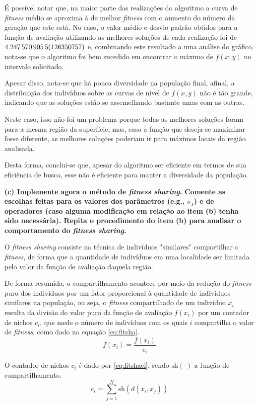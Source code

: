 \documentclass[a4paper, 12pt]{article}
\newcommand{\fitness}{\textit{fitness}\xspace}
\newcommand{\fitsha}{\textit{fitness sharing}\xspace}
\newcommand{\sh}{\text{sh}\xspace}
\begin{document}
É possível notar que, na maior parte das realizações do algoritmo a curva de \fitness médio se aproxima à de melhor \fitness com o aumento do número da geração que este está. No caso, o valor médio e desvio padrão obtidos para a função de avaliação utilizando as melhores soluções de cada realização foi de $\num{4.2475709055\pm 0.0126350757}$ e, combinando este resultado a uma análise do gráfico, nota-se que o algoritmo foi bem sucedido em encontrar o máximo de $f(x,y)$ no intervalo solicitado.

Apesar disso, nota-se que há pouca diversidade na população final, afinal, a distri\-buição dos indivíduos sobre as curvas de nível de $f(x,y)$ não é tão grande, indicando que as soluções estão se assemelhando bastante umas com as outras.

Neste caso, isso não foi um problema porque todas as melhores soluções foram para a mesma região da superfície, mas, caso a função que deseja-se maximizar fosse diferente, as melhores soluções poderiam ir para máximos locais da região analisada.

Desta forma, conclui-se que, apesar do algoritmo ser eficiente em termos de sua eficiência de busca, esse não é eficiente para manter a diversidade da população. 

\textbf{(c) Implemente agora o método de \fitsha. Comente as escolhas feitas para os valores dos parâmetros (e.g., $\sigma_s$) e de operadores (caso alguma modificação em relação ao item (b) tenha sido necessária). Repita o procedimento do item (b) para analisar o comportamento do \fitsha.}

O \fitsha consiste na técnica de indivíduos "similares" compartilhar o \fitness, de forma que a quantidade de indivíduos em uma localidade ser limitada pelo valor da função de avaliação daquela região.

De forma resumida, o compartilhamento acontece por meio da redução do \fitness puro dos indivíduos por um fator proporcional à quantidade de indivíduos similares na população, ou seja, o \fitness compartilhado de um indivíduo $x_i$ resulta da divisão do valor puro da função de avaliação $f(x_i)$ por um contador de nichos $c_i$, que mede o número de indivíduos com os quais $i$ compartilha o valor de \fitness, como dado na equação  \ref{eq:fitsha}.
\begin{equation}\label{eq:fitsha}
    \overline{f} (x_i) = \frac{f(x_i)}{c_i}
\end{equation}

O contador de nichos $c_i$ é dado por \ref{eq:fitshaci}, sendo $\sh(\cdot)$ a função de compartilhamento.
\begin{equation}\label{eq:fitshaci}
    c_i = \sum_{j=1}^N \sh (d(x_i, x_j))
\end{equation}
\end{document}

